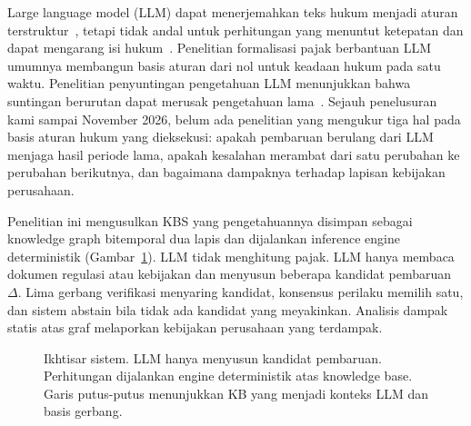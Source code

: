 \documentclass[conference]{IEEEtran}
\makeatletter
\DeclareRobustCommand{\en}[1]{{\usefont{\f@encoding}{\f@family}{\f@series}{it}#1\/}}
\makeatother
\begin{document}
\en{Large language model} (LLM) dapat menerjemahkan teks hukum menjadi aturan terstruktur~\cite{janatian2023texttostructure,makowski2025dmn}, tetapi tidak andal untuk perhitungan yang menuntut ketepatan dan dapat mengarang isi hukum~\cite{blairstanek2023gpt3,nay2024taxattorneys,dahl2024legalfictions}. Penelitian formalisasi pajak berbantuan LLM umumnya membangun basis aturan dari nol untuk keadaan hukum pada satu waktu. Penelitian penyuntingan pengetahuan LLM menunjukkan bahwa suntingan berurutan dapat merusak pengetahuan lama~\cite{gupta2024editing}. Sejauh penelusuran kami sampai November 2026, belum ada penelitian yang mengukur tiga hal pada basis aturan hukum yang dieksekusi: apakah pembaruan berulang dari LLM menjaga hasil periode lama, apakah kesalahan merambat dari satu perubahan ke perubahan berikutnya, dan bagaimana dampaknya terhadap lapisan kebijakan perusahaan.

Penelitian ini mengusulkan KBS yang pengetahuannya disimpan sebagai \en{knowledge graph} bitemporal dua lapis dan dijalankan \en{inference engine} deterministik (Gambar~\ref{fig:ikhtisar}). LLM tidak menghitung pajak. LLM hanya membaca dokumen regulasi atau kebijakan dan menyusun beberapa kandidat pembaruan $\Delta$. Lima gerbang verifikasi menyaring kandidat, konsensus perilaku memilih satu, dan sistem \en{abstain} bila tidak ada kandidat yang meyakinkan. Analisis dampak statis atas graf melaporkan kebijakan perusahaan yang terdampak.

\begin{figure}[t]
\centering
{}
\caption{Ikhtisar sistem. LLM hanya menyusun kandidat pembaruan. Perhitungan dijalankan \en{engine} deterministik atas \en{knowledge base}. Garis putus-putus menunjukkan KB yang menjadi konteks LLM dan basis gerbang.}
\label{fig:ikhtisar}
\end{figure}
\end{document}
